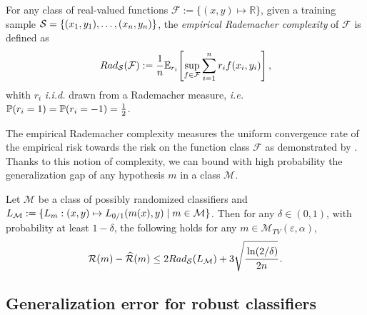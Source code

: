 \begin{definition}
For any class of real-valued functions $\mathcal{F} := \{(x ,y)\mapsto \mathbb{R} \}$, given a training sample $\mathcal{S}=\{({x_1},y_1), \dots ,({x_n},y_n)\}$, the \emph{empirical Rademacher complexity} of $\mathcal{F}$ is defined as
\begin{equation*}
    Rad_{\mathcal{S}}(\mathcal{F}):= \frac1n \mathbb{E}_{r_i}\left[ \sup_{f \in \mathcal{F}} \sum_{i=1}^{n} r_i f({x_i},y_i) \right] \equationspace,
\end{equation*}
whith $r_i$ \emph{i.i.d.} drawn from a Rademacher measure, \emph{i.e.} $\mathbb{P}(r_i = 1) = \mathbb{P}(r_i = -1) = \frac12$.
\end{definition}

The empirical Rademacher complexity measures the uniform convergence rate of the empirical risk towards the risk on the function class $\mathcal{F}$ as demonstrated by \cite{mohri2018foundations}. Thanks to this notion of complexity, we can bound with high probability the generalization gap of any hypothesis $m $ in a class $\mathcal{M}$.

\begin{thm}
\label{thm:RademacherandGenClassicalthm}
Let $\mathcal{M}$ be a class of possibly randomized classifiers and $\loss_{\mathcal{M}} := \{ \loss_{m } :(x ,y) \mapsto \zerooneloss\left(m ({x}),y\right) \mid m  \in \mathcal{M} \}$. Then for any $\delta \in (0,1)$, with probability at least $1-\delta$, the following holds for any $m  \in \mathcal{M}_{TV}\left(\varepsilon,\alpha\right)$,
\begin{equation*}
    \risk\left( m  \right) - \widehat{\risk}\left( m  \right) \leq 2 Rad_{\mathcal{S}}(\loss_{\mathcal{M}}) + 3 \sqrt{\cfrac{\ln(2/\delta)}{2n}} \equationspace.
\end{equation*}
\end{thm}


\subsection{Generalization error for robust classifiers}

